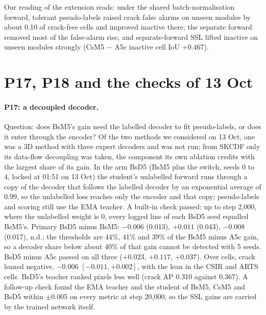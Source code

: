 Our reading of the extension reads: under the shared batch-normalisation forward, tolerant pseudo-labels raised crack false alarms
on unseen modules by about 0.10 of crack-free cells and improved inactive there; the separate forward removed most of the false-alarm
rise, and separate-forward SSL lifted inactive on unseen modules strongly (CsM5 $-$ A5c inactive cell IoU $+0.467$).

\section{P17, P18 and the checks of 13 Oct}\label{sec:pseries-p17}

\paragraph{P17: a decoupled decoder.} Question: does BsM5's gain need the labelled decoder to fit pseudo-labels, or does it enter
through the encoder? Of the two methods we considered on 13 Oct, one was a 3D method with three expert decoders and was not run; from
SKCDF \citep{zhang2025skcdf} only its data-flow decoupling was taken,
the component its own ablation credits with the largest share of its gain. In the arm BsD5 (BsM5 plus the switch, seeds 0 to 4, locked
at 01:51 on 13 Oct) the student's unlabelled forward runs through a copy of the decoder that follows the labelled decoder by an
exponential average of 0.99, so the unlabelled loss reaches only the encoder and that copy; pseudo-labels and scoring still use the
EMA teacher. A built-in check passed: up to step 2,000, where the unlabelled weight is 0, every logged line of each BsD5 seed equalled
BsM5's. Primary BsD5 minus BsM5: $-0.006$ (0.013), $+0.011$ (0.043), $-0.008$ (0.017), n.d.; the thresholds are 44\%, 41\% and 39\% of
the BsM5 minus A5c gain, so a decoder share below about 40\% of that gain cannot be detected with 5 seeds. BsD5 minus A5c passed on
all three ($+0.023$, $+0.117$, $+0.037$). Over cells, crack leaned negative, $-0.006$ $[-0.011, +0.002]$, with the lean in the CSIR
and ARTS cells. BsD5's teacher ranked pixels less well (crack AP 0.310 against 0.367). A follow-up check found the EMA teacher and
the student of BsM5, CsM5 and BsD5 within $\pm$0.005 on every metric at step 20,000, so the SSL gains are carried by the trained
network itself.

